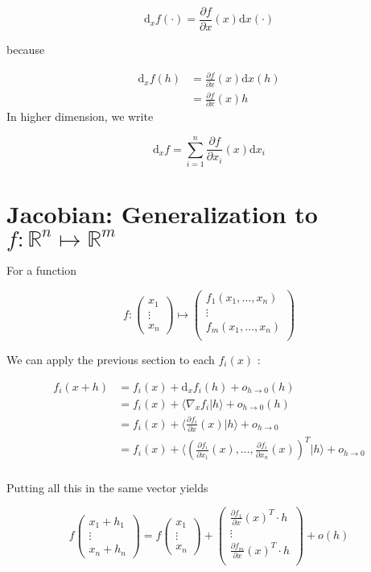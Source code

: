 \documentclass{tufte-handout}
\newcommand{\ud}{\mathrm{d}}
\begin{document}
$$ \ud_x f (\cdot) =  \frac{\partial f}{\partial x}(x) \ud x (\cdot) $$

because

\begin{align*}
\ud_x f (h) &=  \frac{\partial f}{\partial x}(x)  \ud x (h) \\
&= \frac{\partial f}{\partial x}(x)  h
\end{align*}
In higher dimension, we write

$$ \ud_x f = \sum_{i=1}^n \frac{\partial f}{\partial x_i}(x) \ud x_i $$

\section{\textbf{Jacobian}: Generalization to $ f: \mathbb{R}^n \mapsto \mathbb{R}^m $ }
\label{sec:gen}
For a function

$$ f:
\begin{pmatrix}
x_1\\
\vdots\\
x_n
\end{pmatrix} \mapsto
\begin{pmatrix}
f_1(x_1, \ldots, x_n)\\
\vdots\\
f_m(x_1, \ldots, x_n)\\
\end{pmatrix}
$$

We can apply the previous section to each $ f_i(x) $ :

\begin{align*}
f_i(x+h) &= f_i(x) + \ud_x f_i(h) + o_{h \rightarrow 0} (h) \\
&= f_i(x) +  \langle \nabla_x f_i | h \rangle  + o_{h \rightarrow 0} (h)\\
&= f_i(x) +  \langle \frac{\partial f_i}{\partial x}(x) | h \rangle  + o_{h \rightarrow 0}\\
&= f_i(x) +  \langle (\frac{\partial f_i}{\partial x_1}(x), \ldots,  \frac{\partial f_i}{\partial x_n}(x))^T | h \rangle + o_{h \rightarrow 0}\\
\end{align*}

Putting all this in the same vector yields

$$ f \begin{pmatrix}
x_1 + h_1\\
\vdots\\
x_n + h_n
\end{pmatrix} = f
\begin{pmatrix}
x_1\\
\vdots\\
x_n
\end{pmatrix} +
\begin{pmatrix}
\frac{\partial f_1}{\partial x}(x)^T \cdot h\\
\vdots\\
\frac{\partial f_m}{\partial x}(x)^T \cdot h\\
\end{pmatrix} + o(h)
$$
\end{document}
